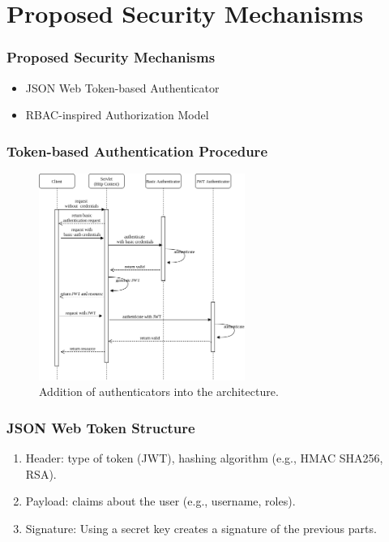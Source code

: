\documentclass{beamer}
\begin{document}
\section{Proposed Security Mechanisms}
\begin{frame}
\frametitle{Proposed Security Mechanisms}
\begin{itemize}
  \setlength\itemsep{1.5em}
\item JSON Web Token-based Authenticator
\item RBAC-inspired Authorization Model
\end{itemize}
\end{frame}
\begin{frame}
\frametitle{Token-based Authentication Procedure}
\begin{figure} [ht] 
\begin{center}
\includegraphics[width=0.6\textwidth]{esh_auth_sequence}
\caption{Addition of authenticators into the architecture.}
\label{fig:esh_arch_authenticator}
\end{center}
\end{figure}
\end{frame}
\begin{frame}
\frametitle{JSON Web Token Structure}
\begin{enumerate}
  \setlength\itemsep{1.5em}  
\item Header: type of token (JWT), hashing algorithm (e.g., HMAC SHA256, RSA).
\item Payload: claims about the user (e.g., username, roles).
\item Signature: Using a secret key creates a signature of the previous parts.
\end{enumerate}
\end{frame}
\end{document}
